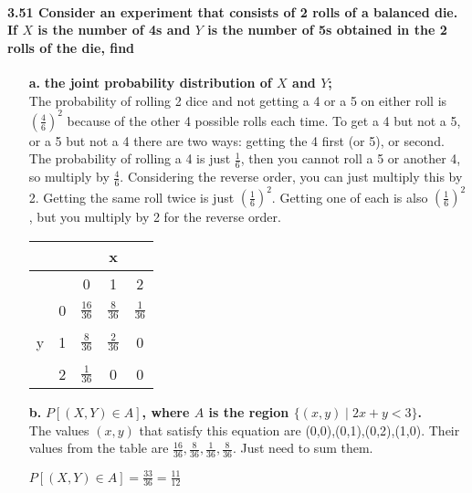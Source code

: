 \documentclass{article}
\begin{document}
\paragraph{3.51 Consider an experiment that consists of 2 rolls of a 
balanced die. If $X$ is the number of 4s and $Y$ is the number of 5s 
obtained in the 2 rolls of the die, find}
\begin{enumerate}
\item[\textbf{a.}] \textbf{the joint probability distribution of $X$ 
and $Y$;}\\
The probability of rolling 2 dice and not getting a 4 or a 5 on 
either roll is $\left(\frac{4}{6}\right)^2$ because of the other 4
possible rolls each time. To get a 4 but not a 5, or a 5 but not a 4
there are two ways: getting the 4 first (or 5), or second. The
probability of rolling a 4 is just $\frac{1}{6}$, then you cannot roll
a 5 or another 4, so multiply by $\frac{4}{6}$. Considering the reverse
order, you can just multiply this by 2. Getting the same roll twice
is just $\left(\frac{1}{6}\right)^2$. Getting one of each is also
$\left(\frac{1}{6}\right)^2$, but you multiply by 2 for the reverse
order.
\begin{center}
\begin{tabular}{|c|c|c c c|}
\hline
   & & & x &\\
\hline
   &   & 0 & 1 & 2\\
\hline
   & 0 & $\frac{16}{36}$ & $\frac{8}{36}$ & $\frac{1}{36}$\\
   &&&&\\
 y & 1 & $\frac{8}{36}$ & $\frac{2}{36}$ & 0\\
   &&&&\\
   & 2 & $\frac{1}{36}$ & 0 & 0\\
\hline
\end{tabular}
\end{center}

\item[\textbf{b.}] \textbf{$P[(X,Y)\in A]$, where $A$ is the region
$\{(x,y)\mid 2x+y<3\}$.}\\
The values $(x,y)$ that satisfy this equation are 
(0,0),(0,1),(0,2),(1,0). Their values from the table are
$\frac{16}{36},\frac{8}{36},\frac{1}{36},\frac{8}{36}$. Just need to
sum them.
\begin{center}
$P[(X,Y) \in A] = \frac{33}{36} = \frac{11}{12}$
\end{center}
\end{enumerate}

\pagebreak
\end{document}
